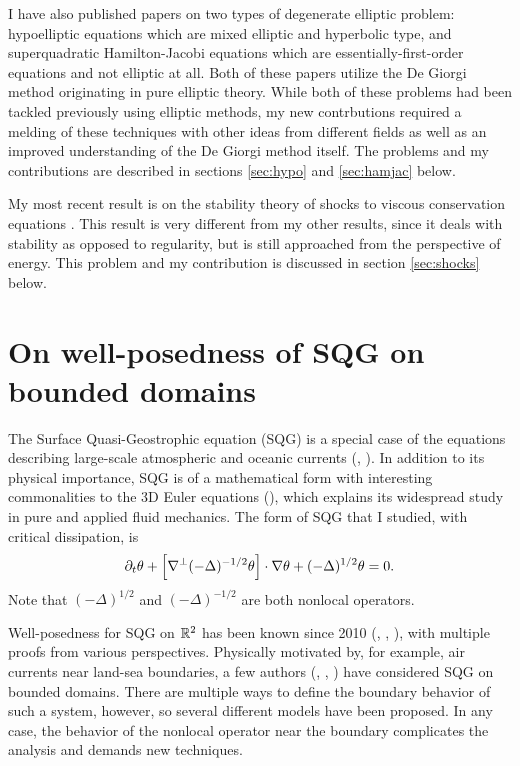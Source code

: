 I have also published papers on two types of degenerate elliptic problem: hypoelliptic equations \cite{St.hypo} which are mixed elliptic and hyperbolic type, and superquadratic Hamilton-Jacobi equations \cite{StVa.hamjac} which are essentially-first-order equations and not elliptic at all.  Both of these papers utilize the De Giorgi method originating in pure elliptic theory.  While both of these problems had been tackled previously using elliptic methods, my new contrbutions required a melding of these techniques with other ideas from different fields as well as an improved understanding of the De Giorgi method itself.  The problems and my contributions are described in sections \ref{sec:hypo} and \ref{sec:hamjac} below.  

My most recent result is on the stability theory of shocks to viscous conservation equations \cite{St.shocks}.  This result is very different from my other results, since it deals with stability as opposed to regularity, but is still approached from the perspective of energy.  This problem and my contribution is discussed in section \ref{sec:shocks} below.  

\section{On well-posedness of SQG on bounded domains} \label{sec:sqg}
The Surface Quasi-Geostrophic equation (SQG) is a special case of the equations describing large-scale atmospheric and oceanic currents (\cite{Pe}, \cite{Ch}).  In addition to its physical importance, SQG is of a mathematical form with interesting commonalities to the 3D Euler equations (\cite{CoMaTa}), which explains its widespread study in pure and applied fluid mechanics.  The form of SQG that I studied, with critical dissipation, is
\begin{equation} \label{eq:sqg} \partial_t \theta + \left[ \nabla^\perp (-\Delta)^{-1/2} \theta \right] \cdot \nabla \theta + (-\Delta)^{1/2} \theta = 0. \end{equation}
Note that $(-\Delta)^{1/2}$ and $(-\Delta)^{-1/2}$ are both nonlocal operators.  

Well-posedness for SQG on $\mathbb{R}^2$ has been known since 2010 (\cite{CaVa}, \cite{KiNaVo}, \cite{CoVi}), with multiple proofs from various perspectives.  Physically motivated by, for example, air currents near land-sea boundaries, a few authors (\cite{Kr.landsea}, \cite{NoVa.bounded}, \cite{NoVa.solutions}) have considered SQG on bounded domains.  There are multiple ways to define the boundary behavior of such a system, however, so several different models have been proposed.  In any case, the behavior of the nonlocal operator near the boundary complicates the analysis and demands new techniques.  

